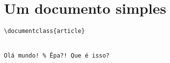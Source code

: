 \section{Um documento simples}

\begin{verbatim}
\documentclass{article}


Olá mundo! % Êpa?! Que é isso?


\end{verbatim}
